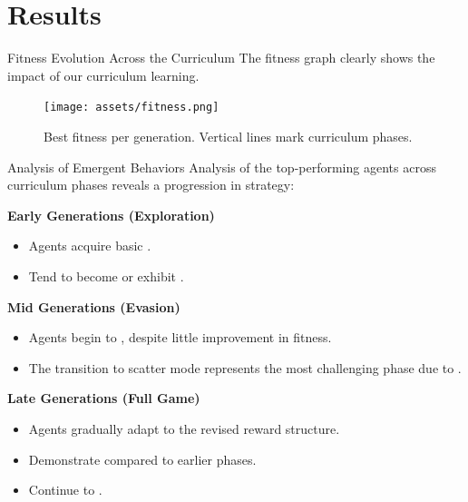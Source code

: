 \section{Results}

\begin{frame}{Fitness Evolution Across the Curriculum}
	The fitness graph clearly shows the impact of our curriculum learning.
	
	\begin{figure}
		\centering
		\texttt{[image: assets/fitness.png]}
		\vspace{-2em}
		
		\caption{Best fitness per generation. Vertical lines mark curriculum phases.}
	\end{figure}
\end{frame}

\begin{frame}{Analysis of Emergent Behaviors}
	Analysis of the top-performing agents across curriculum phases reveals a progression in strategy:

	\textbf{Early Generations (Exploration)}
	\begin{itemize}
		\setlength\itemindent{-1em}
		\item Agents acquire basic .
		\item Tend to become  or exhibit .
	\end{itemize}

	\textbf{Mid Generations (Evasion)}
	\begin{itemize}
		\setlength\itemindent{-1em}
		\item Agents begin to , despite little improvement in fitness.
		\item The transition to scatter mode represents the most challenging phase due to .
	\end{itemize}
	
	\textbf{Late Generations (Full Game)}
	\begin{itemize}
		\setlength\itemindent{-1em}
		\item Agents gradually adapt to the revised reward structure.
		\item Demonstrate  compared to earlier phases.
		\item Continue to .
	\end{itemize}
\end{frame}

